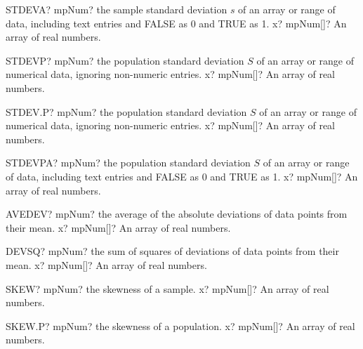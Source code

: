 \documentclass[12pt,a4paper,openany]{book}
\begin{document}
\begin{mpFunctionsExtract}
\mpWorksheetFunctionOneNotImplemented
{STDEVA? mpNum? the sample standard deviation $s$ of an array or range of data, including text entries and FALSE as 0 and TRUE as 1.}
{x? mpNum[]? An array of real numbers.}
\end{mpFunctionsExtract}

\begin{mpFunctionsExtract}
\mpWorksheetFunctionOneNotImplemented
{STDEVP? mpNum? the population standard deviation $S$ of an array or range of numerical data, ignoring non-numeric entries.}
{x? mpNum[]? An array of real numbers.}
\end{mpFunctionsExtract}

\begin{mpFunctionsExtract}
\mpWorksheetFunctionOneNotImplemented
{STDEV.P? mpNum? the population standard deviation $S$ of an array or range of numerical data, ignoring non-numeric entries.}
{x? mpNum[]? An array of real numbers.}
\end{mpFunctionsExtract}

\begin{mpFunctionsExtract}
\mpWorksheetFunctionOneNotImplemented
{STDEVPA? mpNum? the population standard deviation $S$ of an array or range of data, including text entries and FALSE as 0 and TRUE as 1.}
{x? mpNum[]? An array of real numbers.}
\end{mpFunctionsExtract}

\begin{mpFunctionsExtract}
\mpWorksheetFunctionOneNotImplemented
{AVEDEV? mpNum? the average of the absolute deviations of data points from their mean.}
{x? mpNum[]? An array of real numbers.}
\end{mpFunctionsExtract}

\begin{mpFunctionsExtract}
\mpWorksheetFunctionOneNotImplemented
{DEVSQ? mpNum? the sum of squares of deviations of data points from their mean.}
{x? mpNum[]? An array of real numbers.}
\end{mpFunctionsExtract}

\begin{mpFunctionsExtract}
\mpWorksheetFunctionOneNotImplemented
{SKEW? mpNum? the skewness of a sample.}
{x? mpNum[]? An array of real numbers.}
\end{mpFunctionsExtract}

\begin{mpFunctionsExtract}
\mpWorksheetFunctionOneNotImplemented
{SKEW.P? mpNum? the skewness of a population.}
{x? mpNum[]? An array of real numbers.}
\end{mpFunctionsExtract}
\end{document}
